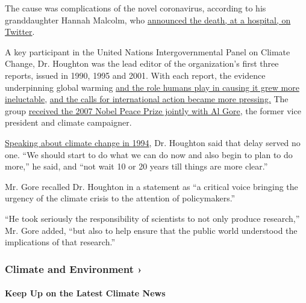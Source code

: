 The cause was complications of the novel coronavirus, according to his
granddaughter Hannah Malcolm, who
\href{https://twitter.com/hannahmmalcolm/status/1250778555505655808}{announced
the death, at a hospital, on Twitter}.

A key participant in the United Nations Intergovernmental Panel on
Climate Change, Dr. Houghton was the lead editor of the organization's
first three reports, issued in 1990, 1995 and 2001. With each report,
the evidence underpinning global warming
\href{https://archive.ipcc.ch/publications_and_data/ar4/wg1/en/ch9s9-1-3.html}{and
the role humans play in causing it grew more ineluctable},
\href{https://www.nytimes.com/2000/10/26/us/a-shift-in-stance-on-global-warming-theory.html}{and
the calls for international action became more pressing.} The group
\href{https://www.nobelprize.org/prizes/peace/2007/summary/}{received
the 2007 Nobel Peace Prize jointly with Al Gore}, the former vice
president and climate campaigner.

\href{https://www.nytimes.com/1994/09/20/science/emissions-must-be-cut-to-avert-shift-in-climate-panel-says.html}{Speaking
about climate change in 1994}, Dr. Houghton said that delay served no
one. ``We should start to do what we can do now and also begin to plan
to do more,'' he said, and ``not wait 10 or 20 years till things are
more clear.''

Mr. Gore recalled Dr. Houghton in a statement as ``a critical voice
bringing the urgency of the climate crisis to the attention of
policymakers.''

``He took seriously the responsibility of scientists to not only produce
research,'' Mr. Gore added, ``but also to help ensure that the public
world understood the implications of that research.''

\href{https://www.nytimes.com/section/climate?action=click\&pgtype=Article\&state=default\&region=MAIN_CONTENT_1\&context=storylines_keepup}{}

\hypertarget{climate-and-environment-}{%
\subsubsection{Climate and Environment
›}\label{climate-and-environment-}}

\hypertarget{keep-up-on-the-latest-climate-news}{%
\paragraph{Keep Up on the Latest Climate
News}\label{keep-up-on-the-latest-climate-news}}

